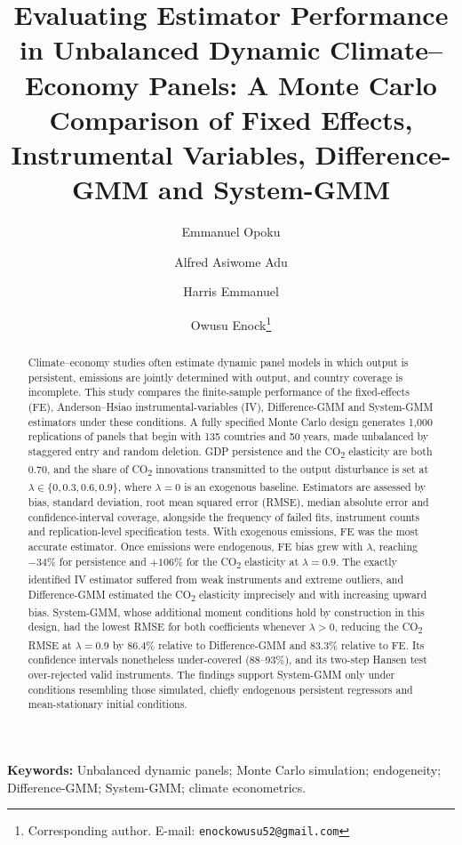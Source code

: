 \documentclass[11pt,a4paper]{article}
\title{\vspace{-1.5em}\textbf{Evaluating Estimator Performance in Unbalanced Dynamic Climate--Economy Panels: A Monte Carlo Comparison of Fixed Effects, Instrumental Variables, Difference-GMM and System-GMM}}
\author[1]{Emmanuel Opoku}
\author[1]{Alfred Asiwome Adu}
\author[1]{Harris Emmanuel}
\author[1]{Owusu Enock\thanks{Corresponding author. E-mail: \texttt{enockowusu52@gmail.com}}}
\affil[1]{Department of Statistics and Actuarial Science, Kwame Nkrumah University of Science and Technology (KNUST), Kumasi, Ghana}
\date{}
\newcommand{\COtwo}{CO\textsubscript{2}}
\begin{document}
\maketitle
\thispagestyle{fancy}

\begin{abstract}
\noindent
Climate--economy studies often estimate dynamic panel models in which output is persistent, emissions are jointly determined with output, and country coverage is incomplete. This study compares the finite-sample performance of the fixed-effects (FE), Anderson--Hsiao instrumental-variables (IV), Difference-GMM and System-GMM estimators under these conditions. A fully specified Monte Carlo design generates 1{,}000 replications of panels that begin with 135 countries and 50 years, made unbalanced by staggered entry and random deletion. GDP persistence and the \COtwo{} elasticity are both 0.70, and the share of \COtwo{} innovations transmitted to the output disturbance is set at $\lambda\in\{0,0.3,0.6,0.9\}$, where $\lambda=0$ is an exogenous baseline. Estimators are assessed by bias, standard deviation, root mean squared error (RMSE), median absolute error and confidence-interval coverage, alongside the frequency of failed fits, instrument counts and replication-level specification tests. With exogenous emissions, FE was the most accurate estimator. Once emissions were endogenous, FE bias grew with $\lambda$, reaching $-34\%$ for persistence and $+106\%$ for the \COtwo{} elasticity at $\lambda=0.9$. The exactly identified IV estimator suffered from weak instruments and extreme outliers, and Difference-GMM estimated the \COtwo{} elasticity imprecisely and with increasing upward bias. System-GMM, whose additional moment conditions hold by construction in this design, had the lowest RMSE for both coefficients whenever $\lambda>0$, reducing the \COtwo{} RMSE at $\lambda=0.9$ by 86.4\% relative to Difference-GMM and 83.3\% relative to FE. Its confidence intervals nonetheless under-covered (88--93\%), and its two-step Hansen test over-rejected valid instruments. The findings support System-GMM only under conditions resembling those simulated, chiefly endogenous persistent regressors and mean-stationary initial conditions.
\end{abstract}

\noindent\textbf{Keywords:} Unbalanced dynamic panels; Monte Carlo simulation; endogeneity; Difference-GMM; System-GMM; climate econometrics.
\end{document}
